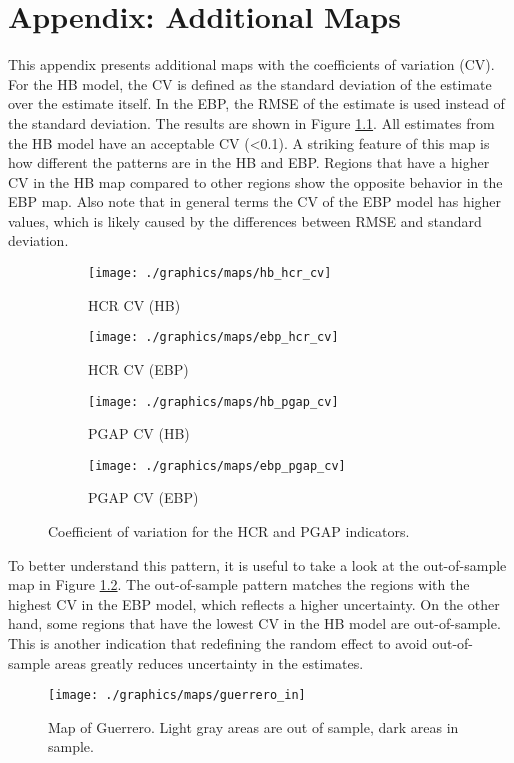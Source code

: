 \chapter{Appendix: Additional Maps}
\label{appendix:cv_maps}

This appendix presents additional maps with the coefficients of variation (CV).
For the HB model, the CV is defined as the standard deviation of the estimate over the estimate itself.
In the EBP, the RMSE of the estimate is used instead of the standard deviation.
The results are shown in Figure \ref{fig:cv_maps}.
All estimates from the HB model have an acceptable CV (<0.1).
A striking feature of this map is how different the patterns are in the HB and EBP.
Regions that have a higher CV in the HB map compared to other regions show the opposite behavior in the EBP map.
Also note that in general terms the CV of the EBP model has higher values, which is likely caused by the differences between RMSE and standard deviation.


\begin{figure}[h]
    \begin{subfigure}{0.49\linewidth}
        \centering
        \texttt{[image: ./graphics/maps/hb\_hcr\_cv]}
        \caption{HCR CV (HB)}
    \end{subfigure}
    \begin{subfigure}{0.49\linewidth}
        \centering
        \texttt{[image: ./graphics/maps/ebp\_hcr\_cv]}
        \caption{HCR CV (EBP)}
    \end{subfigure}

    \begin{subfigure}{0.49\linewidth}
        \centering
        \texttt{[image: ./graphics/maps/hb\_pgap\_cv]}
        \caption{PGAP CV (HB)}
    \end{subfigure}
    \begin{subfigure}{0.49\linewidth}
        \centering
        \texttt{[image: ./graphics/maps/ebp\_pgap\_cv]}
        \caption{PGAP CV (EBP)}
    \end{subfigure}
    \caption{Coefficient of variation for the HCR and PGAP indicators.}
    \label{fig:cv_maps}
\end{figure}

To better understand this pattern, it is useful to take a look at the out-of-sample map in Figure \ref{fig:guerrero_in}.
The out-of-sample pattern matches the regions with the highest CV in the EBP model, which reflects a higher uncertainty.
On the other hand, some regions that have the lowest CV in the HB model are out-of-sample.
This is another indication that redefining the random effect to avoid out-of-sample areas greatly reduces uncertainty in the estimates.


\begin{figure}
    \centering
    \texttt{[image: ./graphics/maps/guerrero\_in]}
       \caption{Map of Guerrero. Light gray areas are out of sample, dark areas in sample.}
    \label{fig:guerrero_in}
\end{figure}